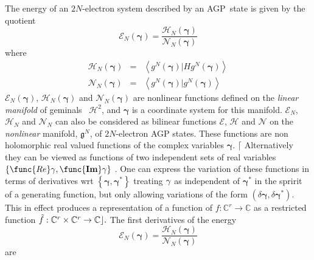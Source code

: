 \documentclass[aps,preprint]{revtex4}
\begin{document}
The energy of an $2N$-electron system described by an AGP\ state is given by
the quotient 
\begin{equation}
\mathcal{E}_{N}\left( \mathbf{\gamma }\right) =\frac{\mathcal{H}_{N}\left( 
\mathbf{\gamma }\right) }{\mathcal{N}_{N}\left( \mathbf{\gamma }\right) }
\end{equation}%
where 
\begin{eqnarray}
\mathcal{H}_{N}\left( \mathbf{\gamma }\right)  &=&\left\langle g^{N}\left( 
\mathbf{\gamma }\right) |Hg^{N}\left( \mathbf{\gamma }\right) \right\rangle 
\\
\mathcal{N}_{N}\left( \mathbf{\gamma }\right)  &=&\left\langle g^{N}\left( 
\mathbf{\gamma }\right) |g^{N}\left( \mathbf{\gamma }\right) \right\rangle 
\end{eqnarray}%
$\mathcal{E}_{N}\left( \mathbf{\gamma }\right) $, $\mathcal{H}_{N}\left( 
\mathbf{\gamma }\right) $ and $\mathcal{N}_{N}\left( \mathbf{\gamma }\right) 
$ are nonlinear functions defined on the \emph{linear manifold }of geminals%
\emph{\ }$\mathcal{H}^{2}$, and $\mathbf{\gamma }$ is a coordinate system
for this manifold. $\mathcal{E}_{N}$, $\mathcal{H}_{N}$ and $\mathcal{N}_{N}$
can also be considered as bilinear functions $\mathcal{E}$, $\mathcal{H}$
and $\mathcal{N}$ on the \emph{nonlinear }manifold, $\mathfrak{g}^{N}$, of $%
2N$-electron AGP states. These functions are non holomorphic real valued
functions of the complex variables $\mathbf{\gamma .}$ $\lceil $%
Alternatively they can be viewed as functions of two independent sets of
real variables $\left\{ \func{Re}\mathbf{\gamma ,\func{Im}\gamma }\right\} $%
. One can express the variation of these functions in terms of derivatives
wrt $\left\{ \mathbf{\gamma ,\gamma }^{\ast }\right\} $ treating $\mathbf{%
\gamma }$ as independent of $\mathbf{\gamma }^{\ast }$ in the spririt of a
generating function, but only allowing variations of the form $\left( \delta 
\mathbf{\gamma ,}\delta \mathbf{\gamma }^{\ast }\right) $. This in effect
produces a representation of a function of $f:\mathbb{C}^{r}\rightarrow 
\mathbb{C}$ as a restricted function $\tilde{f}:\mathbb{C}^{r}\times \mathbb{%
C}^{r}\rightarrow \mathbb{C}\rfloor .$ The first derivatives of the energy 
\begin{equation}
\mathcal{E}_{N}\left( \mathbf{\gamma }\right) =\frac{\mathcal{H}_{N}\left( 
\mathbf{\gamma }\right) }{\mathcal{N}_{N}\left( \mathbf{\gamma }\right) }
\end{equation}%
are 
\end{document}
